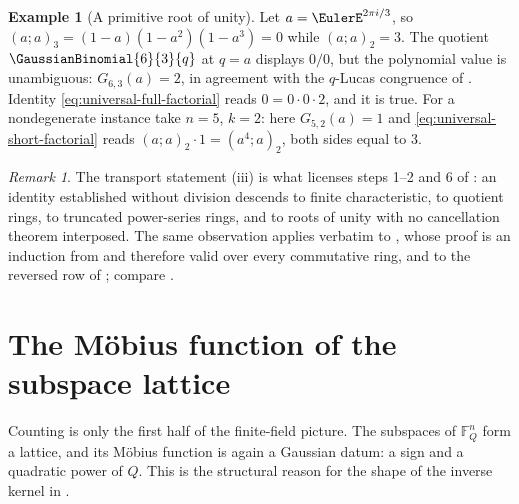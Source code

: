 \documentclass[11pt,a4paper,oneside,openany]{book}
\theoremstyle{definition}
\newtheorem{example}[example]{Example}
\theoremstyle{remark}
\newtheorem{remark}[remark]{Remark}
\newcommand{\F}{\mathbb F}
\begin{document}
\begin{example}[A primitive root of unity]\label{ex:gaussian-root-of-unity}
Let $a=\EulerE^{2\pi i/3}$, so $(a;a)_3=(1-a)(1-a^2)(1-a^3)=0$ while $(a;a)_2=3$.  The quotient $\GaussianBinomial{6}{3}{q}$ at $q=a$ displays $0/0$, but the polynomial value is unambiguous: $G_{6,3}(a)=2$, in agreement with the $q$-Lucas congruence of .  Identity \eqref{eq:universal-full-factorial} reads $0=0\cdot0\cdot2$, and it is true.  For a nondegenerate instance take $n=5$, $k=2$: here $G_{5,2}(a)=1$ and \eqref{eq:universal-short-factorial} reads $(a;a)_2\cdot1=(a^4;a)_2$, both sides equal to $3$.
\end{example}

\begin{remark}
The transport statement (iii) is what licenses steps 1--2 and 6 of : an identity established without division descends to finite characteristic, to quotient rings, to truncated power-series rings, and to roots of unity with no cancellation theorem interposed.  The same observation applies verbatim to , whose proof is an induction from  and therefore valid over every commutative ring, and to the reversed row of ; compare .
\end{remark}



\section{The M\"obius function of the subspace lattice}

Counting is only the first half of the finite-field picture.  The subspaces of $\F_Q^n$ form a lattice, and its M\"obius function is again a Gaussian datum: a sign and a quadratic power of $Q$.  This is the structural reason for the shape of the inverse kernel in .
\end{document}
